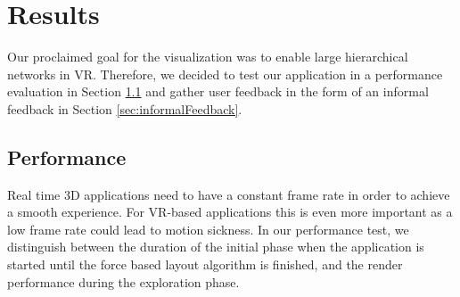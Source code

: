 \chapter{Results}

Our proclaimed goal for the visualization was to enable large hierarchical networks in VR. 
Therefore, we decided to test our application in a performance evaluation in Section \ref{sec:performanceEvaluation} and gather user feedback in the form of an informal feedback in Section \ref{sec:informalFeedback}.

\section{Performance}
\label{sec:performanceEvaluation}

Real time 3D applications need to have a constant frame rate in order to achieve a smooth experience.
For VR-based applications this is even more important as a low frame rate could lead to motion sickness. 
In our performance test, we distinguish between the duration of the initial phase when the application is started until the force based layout algorithm is finished, and the render performance during the exploration phase. 

